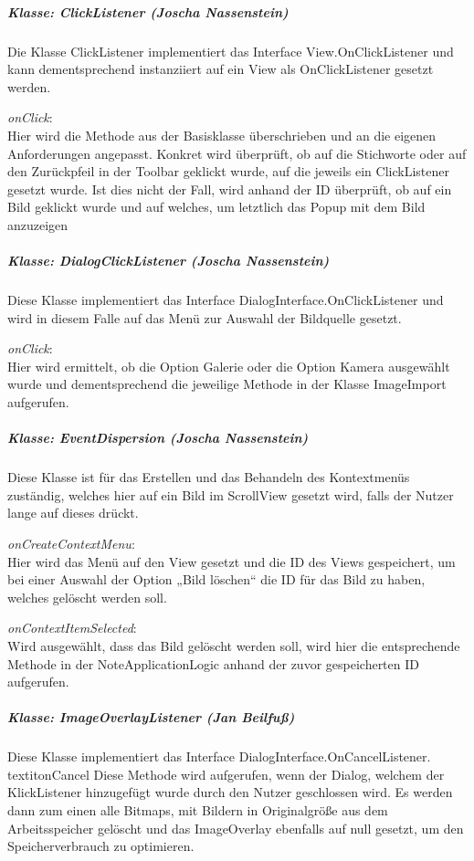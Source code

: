 \subparagraph{Klasse: ClickListener (Joscha Nassenstein)}
Die Klasse ClickListener implementiert das Interface View.OnClickListener und kann dementsprechend instanziiert auf ein View als OnClickListener gesetzt werden.

\textit{onClick}:\\
Hier wird die Methode aus der Basisklasse überschrieben und an die eigenen Anforderungen angepasst. Konkret wird überprüft, ob auf die Stichworte oder auf den Zurückpfeil in der Toolbar geklickt wurde, auf die jeweils ein ClickListener gesetzt wurde. Ist dies nicht der Fall, wird anhand der ID überprüft, ob auf ein Bild geklickt wurde und auf welches, um letztlich das Popup mit dem Bild anzuzeigen

\subparagraph{Klasse: DialogClickListener (Joscha Nassenstein)}
Diese Klasse implementiert das Interface DialogInterface.OnClickListener und wird in diesem Falle auf das Menü zur Auswahl der Bildquelle gesetzt.

\textit{onClick}:\\
Hier wird ermittelt, ob die Option Galerie oder die Option Kamera ausgewählt wurde und dementsprechend die jeweilige Methode in der Klasse ImageImport aufgerufen.

\subparagraph{Klasse: EventDispersion (Joscha Nassenstein)}
Diese Klasse ist für das Erstellen und das Behandeln des Kontextmenüs zuständig, welches hier auf ein Bild im ScrollView gesetzt wird, falls der Nutzer lange auf dieses drückt.

\textit{onCreateContextMenu}:\\
Hier wird das Menü auf den View gesetzt und die ID des Views gespeichert, um bei einer Auswahl der Option „Bild löschen“ die ID für das Bild zu haben, welches gelöscht werden soll.

\textit{onContextItemSelected}:\\
Wird ausgewählt, dass das Bild gelöscht werden soll, wird hier die entsprechende Methode in der NoteApplicationLogic anhand der zuvor gespeicherten ID aufgerufen.

\subparagraph{Klasse: ImageOverlayListener (Jan Beilfuß)}
Diese Klasse implementiert das Interface DialogInterface.OnCancelListener.
textit{onCancel}
Diese Methode wird aufgerufen, wenn der Dialog, welchem der KlickListener hinzugefügt wurde durch den Nutzer geschlossen wird. Es werden dann zum einen alle Bitmaps, mit Bildern in Originalgröße aus dem Arbeitsspeicher gelöscht und das ImageOverlay ebenfalls auf null gesetzt, um den Speicherverbrauch zu optimieren.

